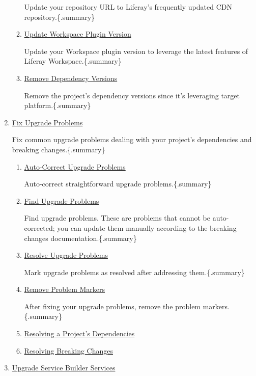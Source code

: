 \begin{enumerate}
\begin{enumerate}
    Update your repository URL to Liferay's frequently updated CDN
    repository.\{.summary\}
  \item
    \href{/docs/7-2/tutorials/-/knowledge_base/t/upgrading-build-dependencies\#updating-the-workspace-plugin-version}{Update
    Workspace Plugin Version}

    Update your Workspace plugin version to leverage the latest features
    of Liferay Workspace.\{.summary\}
  \item
    \href{/docs/7-2/tutorials/-/knowledge_base/t/upgrading-build-dependencies\#removing-your-projects-build-dependency-versions}{Remove
    Dependency Versions}

    Remove the project's dependency versions since it's leveraging
    target platform.\{.summary\}
  \end{enumerate}
\item
  \href{/docs/7-2/tutorials/-/knowledge_base/t/fixing-upgrade-problems}{Fix
  Upgrade Problems}

  Fix common upgrade problems dealing with your project's dependencies
  and breaking changes.\{.summary\}

  \begin{enumerate}
  \def\labelenumii{\arabic{enumii}.}
  \item
    \href{/docs/7-2/tutorials/-/knowledge_base/t/fixing-upgrade-problems\#auto-correcting-upgrade-problems}{Auto-Correct
    Upgrade Problems}

    Auto-correct straightforward upgrade problems.\{.summary\}
  \item
    \href{/docs/7-2/tutorials/-/knowledge_base/t/fixing-upgrade-problems\#finding-upgrade-problems}{Find
    Upgrade Problems}

    Find upgrade problems. These are problems that cannot be
    auto-corrected; you can update them manually according to the
    breaking changes documentation.\{.summary\}
  \item
    \href{/docs/7-2/tutorials/-/knowledge_base/t/fixing-upgrade-problems\#resolving-upgrade-problems}{Resolve
    Upgrade Problems}

    Mark upgrade problems as resolved after addressing them.\{.summary\}
  \item
    \href{/docs/7-2/tutorials/-/knowledge_base/t/fixing-upgrade-problems\#removing-problem-markers}{Remove
    Problem Markers}

    After fixing your upgrade problems, remove the problem
    markers.\{.summary\}
  \item
    \href{/docs/7-2/tutorials/-/knowledge_base/t/resolving-a-projects-dependencies}{Resolving
    a Project's Dependencies}
  \item
    \href{/docs/7-2/tutorials/-/knowledge_base/t/resolving-breaking-changes}{Resolving
    Breaking Changes}
  \end{enumerate}
\item
  \href{/docs/7-2/tutorials/-/knowledge_base/t/upgrading-service-builder-services}{Upgrade
  Service Builder Services}


\end{enumerate}
